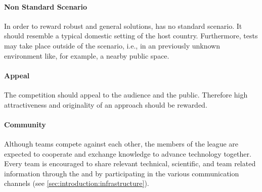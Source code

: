 \paragraph{Non Standard Scenario}
\label{sec:concepts:nonstandardscenario}
In order to reward robust and general solutions, \RoboCup\AtHome{} has no standard scenario. It should resemble a typical domestic setting of the host country. Furthermore, tests may take place outside of the scenario, i.e., in an previously unknown environment like, for example, a nearby public space.

\paragraph{Appeal}
\label{sec:concepts:appeal}
The competition should appeal to the audience and the public. Therefore high attractiveness and originality of an approach should be rewarded.

\paragraph{Community}
\label{sec:concepts:community}
Although teams compete against each other, the members of the \AtHome{} league are expected to cooperate and exchange knowledge to advance technology together. Every team is encouraged to share relevant technical, scientific, and team related information through the \TDP{} and by participating in the various communication channels (see \ref{sec:introduction:infrastructure}).


